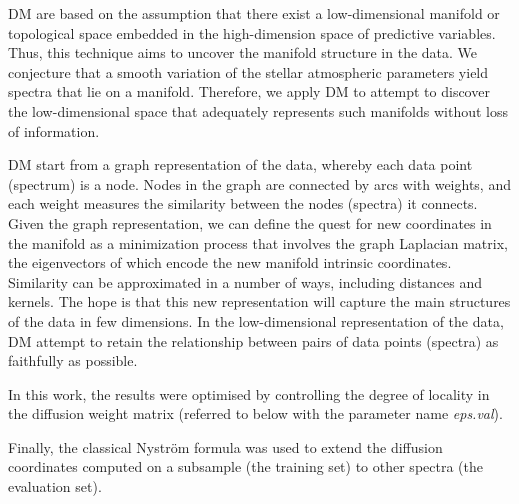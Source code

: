 \documentclass[a4paper,fleqn,usenatbib]{mnras}
\begin{document}
{{DM are based on the assumption that there exist a low-dimensional 
manifold or topological space embedded in the high-dimension space 
of predictive variables. Thus, this technique aims to uncover the 
manifold structure in the data. We conjecture that a smooth variation 
of the stellar atmospheric parameters yield spectra that lie on a 
manifold. Therefore, we apply DM to attempt to discover the 
low-dimensional space that adequately represents such manifolds without
loss of information.
 
DM start from a graph representation of the data, whereby each data point 
(spectrum) is a node. Nodes in the graph are connected by arcs with weights, 
and each weight measures the similarity between the nodes (spectra) it 
connects. Given the graph representation, we can define the quest for new 
coordinates in the manifold as a minimization process that involves the 
graph Laplacian matrix, the eigenvectors of which encode the new manifold intrinsic coordinates.  
Similarity can be approximated in a number of ways, including 
distances and kernels. The hope is that this new representation will capture 
the main structures of the data in few dimensions.
In the low-dimensional representation of the data, DM attempt to retain 
the relationship between pairs of data points (spectra) as faithfully as 
possible.}


In this work, the results were optimised by controlling the degree of
locality in the diffusion weight matrix (referred to below with 
the parameter name \textit{eps.val}).

Finally, the classical Nystr\"{o}m formula \citep{NIPS2000_1866} was used
to extend the diffusion coordinates computed on a subsample (the training 
set) to other spectra (the evaluation set).


}
\end{document}
